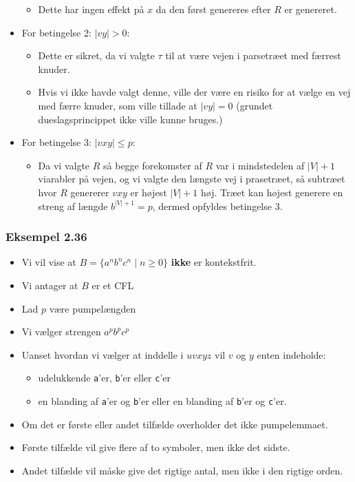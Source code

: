 \begin{frame}[allowframebreaks]
\begin{itemize}
\begin{itemize}
			      \item Dette har ingen effekt på $x$ da den først genereres efter $R$ er genereret.
		      \end{itemize}
		\item For betingelse 2: $|vy| > 0$:
		      \begin{itemize}
			      \item Dette er sikret, da vi valgte $\tau$ til at være vejen i parsetræet med færrest knuder.
			      \item Hvis vi ikke havde valgt denne, ville der være en risiko for at vælge en vej med færre knuder, som ville tillade at $|vy| = 0$ (grundet dueslagsprincippet ikke ville kunne bruges.)
		      \end{itemize}
		\item For betingelse 3: $|vxy| \le p$:
		      \begin{itemize}
			      \item Da vi valgte $R$ så begge forekomster af $R$ var i mindstedelen af $|V|+1$ viarabler på vejen, og vi valgte den længste vej i prasetræet, så subtræet hvor $R$ genererer $vxy$ er højest $|V|+1$ høj. Træet kan højest generere en streng af længde $b^{|V|+1} = p$, dermed opfyldes betingelse 3.
		      \end{itemize}
	\end{itemize}
\end{frame}

\begin{frame}[allowframebreaks]
	\frametitle{Eksempel 2.36}

	\begin{itemize}
		\item Vi vil vise at $B = \{a^{n}b^{n}c^{n} \mid n \ge 0\}$ \textbf{ikke} er kontekstfrit.
		\item Vi antager at $B$ er et CFL
		\item Lad $p$ være pumpelængden
		\item Vi vælger strengen $a^{p}b^{p}c^{p}$
		\item Uanset hvordan vi vælger at inddelle i $uvxyz$ vil $v$ og $y$ enten indeholde:
		      \begin{itemize}
			      \item udelukkende \texttt{a}'er, \texttt{b}'er eller \texttt{c}'er
			      \item en blanding af \texttt{a}'er og \texttt{b}'er eller en blanding af \texttt{b}'er og \texttt{c}'er.
		      \end{itemize}
		\item Om det er første eller andet tilfælde overholder det ikke pumpelemmaet.
		\item Første tilfælde vil give flere af to symboler, men ikke det sidste.
		\item Andet tilfælde vil måske give det rigtige antal, men ikke i den rigtige orden.
	\end{itemize}
\end{frame}

